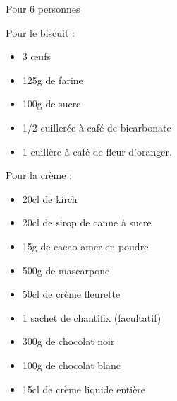 \bigskip
{}
{Pour 6 personnes}{Pour le biscuit :
\begin{itemize}
	\item 3 \oe ufs
	\item 125g de farine
	\item 100g de sucre
	\item 1/2 cuillerée à café de bicarbonate
	\item 1 cuillère à café de fleur d'oranger.
\end{itemize}
Pour la crème :	
\begin{itemize}
	\item 20cl de kirch
	\item 20cl de sirop de canne à sucre
	\item 15g de cacao amer en poudre
	\item 500g de mascarpone
	\item 50cl de crème fleurette
	\item 1 sachet de chantifix (facultatif)
	\item 300g de chocolat noir
	\item 100g de chocolat blanc
	\item 15cl de crème liquide entière
\end{itemize}}
